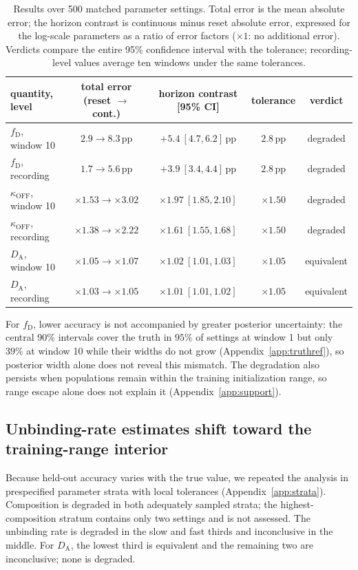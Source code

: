 \documentclass{article}
\newcommand{\fD}{f_{\mathrm{D}}}
\newcommand{\DA}{D_{\mathrm{A}}}
\newcommand{\koff}{\kappa_{\mathrm{OFF}}}
\newcommand{\pp}{\,\mathrm{pp}}
\begin{document}
\begin{table}[t]
\caption{Results over 500 matched parameter settings. Total error is the
mean absolute error; the horizon contrast is continuous minus reset absolute
error, expressed for the log-scale parameters as a ratio of error factors
($\times1$: no additional error). Verdicts compare the entire 95\% confidence
interval with the tolerance; recording-level values average ten windows under
the same tolerances.}
\label{tab:headline}
\centering
\footnotesize
\begin{tabular}{lcccc}
\toprule
quantity, level & total error (reset $\rightarrow$ cont.) & horizon contrast [95\% CI] & tolerance & verdict \\
\midrule
$\fD$, window 10 & $2.9\rightarrow8.3\pp$ & $+5.4\ [4.7,6.2]\pp$ & $2.8\pp$ & degraded \\
$\fD$, recording & $1.7\rightarrow5.6\pp$ & $+3.9\ [3.4,4.4]\pp$ & $2.8\pp$ & degraded \\
$\koff$, window 10 & $\times1.53\rightarrow\times3.02$ & $\times1.97\ [1.85,2.10]$ & $\times1.50$ & degraded \\
$\koff$, recording & $\times1.38\rightarrow\times2.22$ & $\times1.61\ [1.55,1.68]$ & $\times1.50$ & degraded \\
$\DA$, window 10 & $\times1.05\rightarrow\times1.07$ & $\times1.02\ [1.01,1.03]$ & $\times1.05$ & equivalent \\
$\DA$, recording & $\times1.03\rightarrow\times1.05$ & $\times1.01\ [1.01,1.02]$ & $\times1.05$ & equivalent \\
\bottomrule
\end{tabular}
\end{table}

For $\fD$, lower accuracy is not accompanied by greater posterior
uncertainty: the central 90\% intervals cover the truth in $95\%$ of settings
at window 1 but only $39\%$ at window 10 while their widths do not grow
(Appendix~\ref{app:truthref}), so posterior width alone does not reveal this
mismatch. The degradation also
persists when populations remain within the training initialization range,
so range escape alone does not explain it (Appendix~\ref{app:support}).

\subsection{Unbinding-rate estimates shift toward the training-range interior}
\label{sec:structure}

Because held-out accuracy varies with the true value, we repeated the
analysis in prespecified parameter strata with local tolerances
(Appendix~\ref{app:strata}). Composition is degraded in both
adequately sampled strata; the highest-composition stratum contains only two
settings and is not assessed. The unbinding rate is degraded in the slow and
fast thirds and inconclusive in the middle. For $\DA$, the lowest third is
equivalent and the remaining two are inconclusive; none is degraded.
\end{document}
